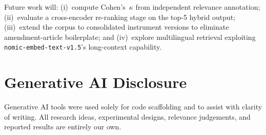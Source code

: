 \documentclass[conference]{IEEEtran}
\newcommand{\nomic}{\texttt{nomic-embed-text-v1.5}\xspace}
\begin{document}
Future work will: (i)~compute Cohen's~$\kappa$ from independent
relevance annotation; (ii)~evaluate a cross-encoder re-ranking stage
on the top-5 hybrid output; (iii)~extend the corpus to consolidated
instrument versions to eliminate amendment-article boilerplate; and
(iv)~explore multilingual retrieval exploiting \nomic's long-context
capability.

\section*{Generative AI Disclosure}

Generative AI tools were used solely for code scaffolding and to
assist with clarity of writing.
All research ideas, experimental designs, relevance judgements, and
reported results are entirely our own.
\end{document}
